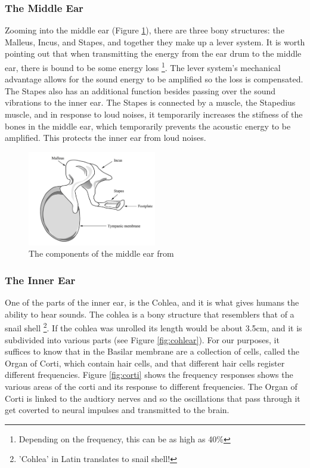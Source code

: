 \documentclass[logo,bsc,singlespacing,parskip,online]{infthesis}
\begin{document}
\subsubsection{The Middle Ear}
Zooming into the middle ear (Figure \ref{fig:middle-ear}), there are three bony structures: the Malleus, Incus, and Stapes,
and together they make up a lever system. 
It is worth pointing out that when transmitting the energy from the ear drum to the middle ear, there is bound to be some energy 
loss \footnote{Depending on the frequency, this can be as high as 40\%}. The lever system's mechanical advantage 
allows for the sound energy to be amplified so the loss is compensated. 
The Stapes also has an additional function besides passing over the sound vibrations to the inner ear. The Stapes 
is connected by a muscle, the Stapedius muscle, and in response to loud noises, it temporarily increases the stifness
of the bones in the middle ear, which temporarily prevents the acoustic energy to be amplified. This 
protects the inner ear from loud noises.

\begin{figure}[h]
   \centering
   \includegraphics[width=0.5\textwidth]{wayland-middle-ear.png}
   \caption{The components of the middle ear from \citet{Wayland2018Phonetics}}
   \label{fig:middle-ear}
\end{figure}

\subsubsection{The Inner Ear}
One of the parts of the inner ear, is the Cohlea, and it is what gives humans the ability to hear sounds.
The cohlea is a bony structure that resemblers that of a snail shell \footnote{'Cohlea' in Latin translates to snail shell!}.
If the cohlea was unrolled its length would be about 3.5cm, and it is subdivided into various parts (see Figure \ref{fig:cohlear}).
For our purposes, it suffices to know that in the Basilar membrane are a collection of cells, called 
the Organ of Corti, which contain hair cells, and that different hair cells register different frequencies.
Figure \ref{fig:corti} shows the frequency responses shows the various areas of the corti 
and its response to different frequencies. The Organ of Corti is linked to the audtiory nerves and 
so the oscillations that pass through it get coverted to neural impulses and transmitted to the brain.
\end{document}
